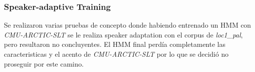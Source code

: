 \subsubsection{Speaker-adaptive Training}

Se realizaron varias pruebas de concepto donde habiendo entrenado un HMM con \textit{CMU-ARCTIC-SLT} se le realiza speaker adaptation con el corpus de \textit{loc1\_pal}, pero resultaron no concluyentes. El HMM final perdía completamente las caracteristicas y el acento de \textit{CMU-ARCTIC-SLT} por lo que se decidió no proseguir por este camino. 
